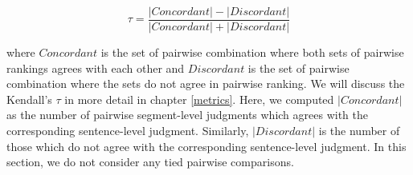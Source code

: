 \begin{equation*}
  \tau = \frac{|Concordant| - |Discordant|}{|Concordant| + |Discordant|}
\end{equation*}

\noindent where $Concordant$ is the set of pairwise combination where both sets
of pairwise rankings agrees with each other and $Discordant$ is the set of
pairwise combination where the sets do not agree in pairwise ranking.
  We will discuss the Kendall's $\tau$ in
more detail in chapter \ref{metrics}. Here, we computed $|Concordant|$ as the
number of pairwise segment-level judgments which agrees with the corresponding
sentence-level judgment. Similarly, $|Discordant|$ is the number of those which
do not agree with the corresponding sentence-level judgment. In this section,
we do not consider any tied pairwise comparisons.

